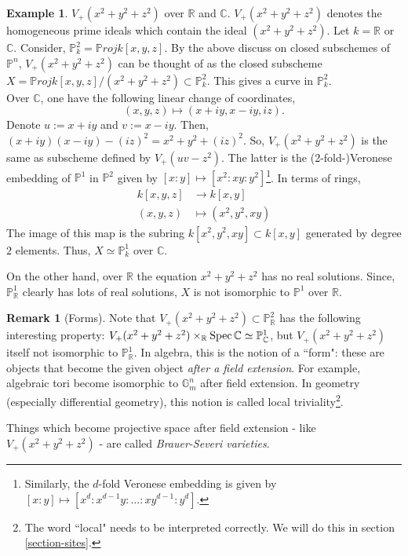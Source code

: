 \documentclass[11pt]{amsart}
\newcommand{\Proj}{{\P roj}}
\newcommand{\Spec}{{\rm Spec \,}}
\newcommand{\C}{{\mathbb C}}
\newcommand{\G}{{\mathbb G}}
\renewcommand{\P}{{\mathbb P}}
\newcommand{\R}{{\mathbb R}}
\theoremstyle{definition}
\newtheorem{example}[theorem]{Example}
\newtheorem{remark}[theorem]{Remark}
\begin{document}
\begin{example}\label{example-forms}
$V_{+}(x^2+y^2+z^2)$ over $\R$ and $\C$. $V_{+}(x^2+y^2+z^2)$ denotes the homogeneous prime ideals which contain the ideal $(x^2+y^2+z^2)$. Let $k=\R$ or $\C$. Consider, $\P_k^2=\Proj k[x,y,z]$. By the above discuss on closed subschemes of $\P^n$, $V_{+}(x^2+y^2+z^2)$ can be thought of as the closed subscheme $X=\Proj k[x,y,z]/(x^2+y^2+z^2)\subset \P_k^2$. This gives a curve in $\P_k^2$.\\
Over $\C$, one have the following linear change of coordinates, 
\[(x,y,z)\mapsto (x+iy,x-iy,iz).\] 
Denote $u:=x+iy$ and $v:=x-iy$. Then, $(x+iy) (x-iy) -(iz)^2= x^2+y^2+(iz)^2$. So, $V_{+}(x^2+y^2+z^2)$ is the same as subscheme defined by $V_+(uv-z^2)$. The latter is the (2-fold-)Veronese embedding of $\P^1$ in $\P^2$ given by $[x:y]\mapsto [x^2:xy:y^2]$\footnote{Similarly, the $d$-fold Veronese embedding is given by $[x:y]\mapsto [x^d:x^{d-1}y:\ldots:xy^{d-1}:y^d]$.}. In terms of rings,
\begin{align*}
k[x,y,z]&\rightarrow k[x,y]\\
(x,y,z)&\mapsto (x^2,y^2,xy)
\end{align*}
The image of this map is the subring $k[x^2,y^2,xy]\subset k[x,y]$ generated by degree $2$ elements. Thus, $X\simeq \P_{k}^1$ over $\C$.

On the other hand, over $\R$ the equation $x^2+y^2+z^2$ has no real solutions. Since, $\P_{\R}^1$ clearly has lots of real solutions, $X$ is not isomorphic to $\P^1$ over $\R$.
\end{example}


\begin{remark}[Forms]\label{remark-forms}
	Note that $V_+(x^2+y^2+z^2)\subset \P_{\R}^2$ has the following interesting property: $V_+(x^2+y^2+z^2)\times_{\R}\Spec \C\simeq \P_{\C}^1$, but $V_+(x^2+y^2+z^2)$ itself not isomorphic to $\P_{\R}^1$. In algebra, this is the notion of a ``form": these are objects that become the given object \textit{after a field extension}. For example, algebraic tori become isomorphic to $\G_m^n$ after field extension. In geometry (especially differential geometry), this notion is called local triviality\footnote{The word ``local" needs to be interpreted correctly. We will do this in section \ref{section-sites}.}.
	
	Things which become projective space after field extension - like $V_+(x^2+y^2+z^2)$ - are called  \textit{Brauer-Severi varieties}.
\end{remark}
\end{document}
